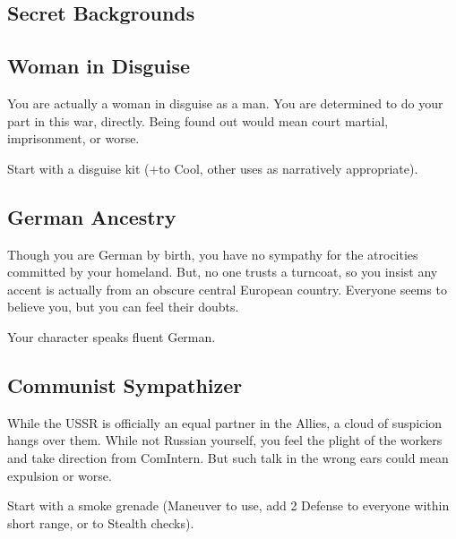 \documentclass{book}
\newcommand{\bbb}{\BoostDie }
\begin{document}
\begin{multicols}{2}
\newpage

\section{Secret Backgrounds}

\subsection{Woman in Disguise}

You are actually a woman in disguise as a man.  You are determined to do your part in this war, directly.  Being found out would mean court martial, imprisonment, or worse.

Start with a disguise kit (+\bbb to Cool, other uses as narratively appropriate).

\subsection{German Ancestry}

Though you are German by birth, you have no sympathy for the atrocities committed by your homeland.  But, no one trusts a turncoat, so you insist any accent is actually from an obscure central European country.  Everyone seems to believe you, but you can feel their doubts.

Your character speaks fluent German.

\subsection{Communist Sympathizer}

While the USSR is officially an equal partner in the Allies, a cloud of suspicion hangs over them.  While not Russian yourself, you feel the plight of the workers and take direction from ComIntern.  But such talk in the wrong ears could mean expulsion or worse.

Start with a smoke grenade (Maneuver to use, add 2 Defense to everyone within short range, or \bbb\bbb to Stealth checks).

%
%


\end{multicols}
\end{document}
